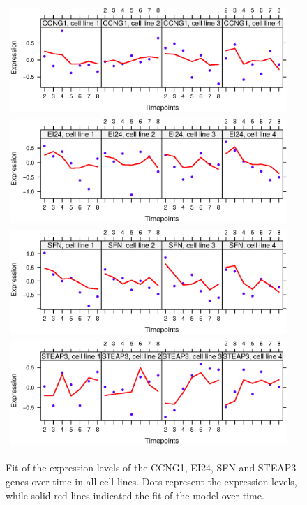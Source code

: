 \documentclass[a4paper]{article}
\begin{document}
\begin{figure}[h!]
\centering
\begin{tabular}{cc}
\includegraphics[scale=0.7]{fit2obs_CCNG1.eps}
\\
\includegraphics[scale=0.7]{fit2obs_EI24.eps}
\\
\includegraphics[scale=0.7]{fit2obs_SFN.eps}
\\
\includegraphics[scale=0.7]{fit2obs_STEAP3.eps}
\end{tabular}
\caption{Fit of the expression levels of the CCNG1, EI24, SFN and STEAP3 genes over time in all cell lines. Dots represent the expression levels, while solid red lines indicated the fit of the model over time.}
\label{figSM:genewiseFits}
\end{figure}
\afterpage{\clearpage}
\end{document}
